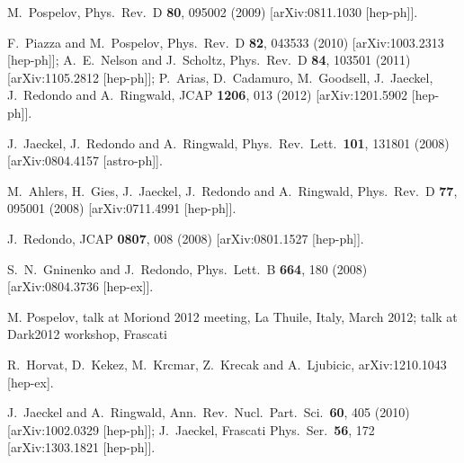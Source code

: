 \documentclass[12pt]{article}
\begin{document}
\begin{thebibliography}{99}
  M.~Pospelov,
  Phys.\ Rev.\ D {\bf 80}, 095002 (2009)
  [arXiv:0811.1030 [hep-ph]].

F.~Piazza and M.~Pospelov,
  Phys.\ Rev.\ D {\bf 82}, 043533 (2010)
  [arXiv:1003.2313 [hep-ph]];
A.~E.~Nelson and J.~Scholtz,
  Phys.\ Rev.\ D {\bf 84}, 103501 (2011)
  [arXiv:1105.2812 [hep-ph]];
  P.~Arias, D.~Cadamuro, M.~Goodsell, J.~Jaeckel, J.~Redondo and A.~Ringwald,
  JCAP {\bf 1206}, 013 (2012)
  [arXiv:1201.5902 [hep-ph]].

  J.~Jaeckel, J.~Redondo and A.~Ringwald,
  Phys.\ Rev.\ Lett.\  {\bf 101}, 131801 (2008)
  [arXiv:0804.4157 [astro-ph]].

  M.~Ahlers, H.~Gies, J.~Jaeckel, J.~Redondo and A.~Ringwald,
  Phys.\ Rev.\ D {\bf 77}, 095001 (2008)
  [arXiv:0711.4991 [hep-ph]].

  J.~Redondo,
  JCAP {\bf 0807}, 008 (2008)
  [arXiv:0801.1527 [hep-ph]].

  S.~N.~Gninenko and J.~Redondo,
  Phys.\ Lett.\ B {\bf 664}, 180 (2008)
  [arXiv:0804.3736 [hep-ex]].

 M. Pospelov, talk at Moriond 2012 meeting, La Thuile, Italy, March 2012; 
talk at  Dark2012 workshop, Frascati 

  R.~Horvat, D.~Kekez, M.~Krcmar, Z.~Krecak and A.~Ljubicic,
  arXiv:1210.1043 [hep-ex].

  J.~Jaeckel and A.~Ringwald,
  Ann.\ Rev.\ Nucl.\ Part.\ Sci.\  {\bf 60}, 405 (2010)
  [arXiv:1002.0329 [hep-ph]];
  J.~Jaeckel,
  Frascati Phys.\ Ser.\  {\bf 56}, 172
  [arXiv:1303.1821 [hep-ph]].


\end{thebibliography}
\end{document}
